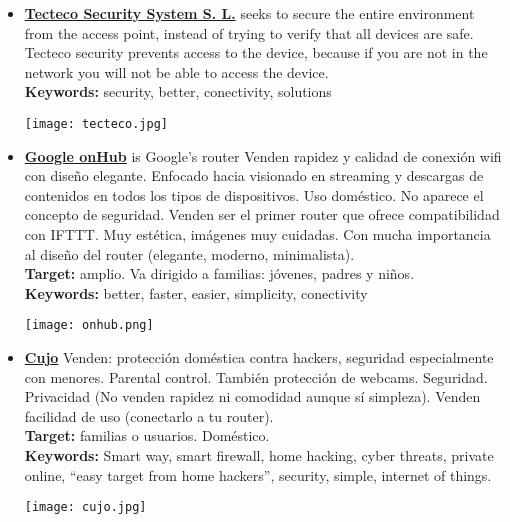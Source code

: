 \begin{itemize}
	\item \href{https://tecteco.com/}{\textbf{Tecteco Security System S. L.}} seeks to secure the entire environment from the access point, instead of trying to verify that all devices are safe. Tecteco security prevents access to the device, because if you are not in the network you will not be able to access the device.\\
	\textbf{Keywords:} security, better, conectivity, solutions\\
	\begin{center}
		\texttt{[image: tecteco.jpg]}
	\end{center}
	
	\item \href{https://on.google.com/hub/}{\textbf{Google onHub}} is Google's router Venden rapidez y calidad de conexión wifi con diseño elegante. Enfocado hacia visionado en streaming y descargas de contenidos en todos los tipos de dispositivos. Uso doméstico. No aparece el concepto de seguridad. Venden ser el primer router que ofrece compatibilidad con IFTTT. Muy estética, imágenes muy cuidadas. Con mucha importancia al diseño del router (elegante, moderno, minimalista).\\ 
	\textbf{Target:} amplio. Va dirigido a familias: jóvenes, padres y niños.\\
	\textbf{Keywords:} better, faster, easier, simplicity, conectivity\\
	\begin{center}
		\texttt{[image: onhub.png]}
	\end{center}
	
	\newpage
	\item \href{https://www.getcujo.com/}{\textbf{Cujo}} Venden: protección doméstica contra hackers, seguridad especialmente con menores. Parental control. También protección de webcams. Seguridad. Privacidad (No venden rapidez ni comodidad aunque sí simpleza). Venden facilidad de uso (conectarlo a tu router).\\
	\textbf{Target:} familias o usuarios. Doméstico.\\
	\textbf{Keywords:} Smart way, smart firewall, home hacking, cyber threats, private online, ``easy target from home hackers'', security, simple, internet of things.\\
	\begin{center}
		\texttt{[image: cujo.jpg]}
	\end{center}
	

\end{itemize}
